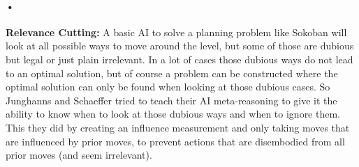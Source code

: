 \documentclass{article}
\begin{document}
\paragraph*{•}
\textbf{Relevance Cutting:} A basic AI to solve a planning problem like Sokoban will look at all possible ways to move around the level, but some of those are dubious but legal or just plain irrelevant. In a lot of cases those dubious ways do not lead to an optimal solution, but of course a problem can be constructed where the optimal solution can only be found when looking at those dubious cases. So Junghanns and Schaeffer tried to teach their AI meta-reasoning to give it the ability to know when to look at those dubious ways and when to ignore them. This they did by creating an influence measurement and only taking moves that are influenced by prior moves, to prevent actions that are disembodied from all prior moves (and seem irrelevant).
\end{document}
